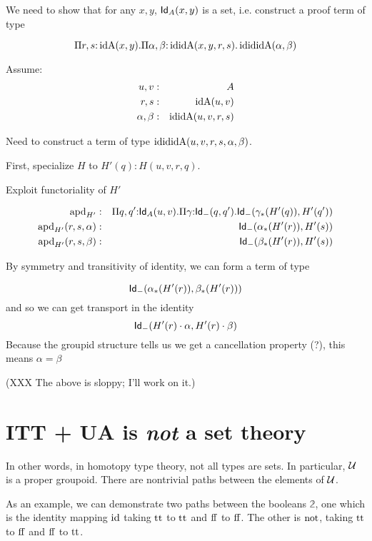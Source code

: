\documentclass[11pt]{article}
\begin{document}
We need to show that for any $x,y$, 
$\mathsf{Id}_{A}(x,y)$ is a set, i.e. construct a proof term of type

\[
\Pi{r,s}{:}\operatorname{idA}(x,y).\Pi{\alpha,\beta}{:}\operatorname{ididA}(x,y,r,s).
\operatorname{idididA}(\alpha,\beta)
\]

Assume:
\begin{eqnarray*}
u,v &:& A\\
r,s &:& \operatorname{idA}(u,v)\\
\alpha,\beta &:& \operatorname{ididA}(u,v,r,s)
\end{eqnarray*}

Need to construct a term of type $\operatorname{idididA}(u,v,r,s,\alpha,\beta)$.

First, specialize $H$ to $H'(q) : H(u,v,r,q)$.

Exploit functoriality of $H'$

\begin{eqnarray*}
\operatorname{apd}_{H'} &:& \Pi{q,q'}{:}\mathsf{Id}_{A}(u,v).
                \Pi{\gamma}{:}\mathsf{Id}_{-}(q,q').
                  \mathsf{Id}_{-}(\gamma_{*}(H'(q)), H'(q'))\\
\operatorname{apd}_{H'}(r,s,\alpha) &:& \mathsf{Id}_{-}(\alpha_{*}(H'(r)), H'(s))\\
\operatorname{apd}_{H'}(r,s,\beta) &:& \mathsf{Id}_{-}(\beta_*{}(H'(r)), H'(s))
\end{eqnarray*}

By symmetry and transitivity of identity, we can form a term of type

\[
\mathsf{Id}_{-}(\alpha_*(H'(r)), \beta_*(H'(r)))
\]
and so we can get transport in the identity
\[
\mathsf{Id}_{-}(H'(r)\cdot \alpha, H'(r)\cdot\beta)
\]
Because the groupid structure tells us we get a cancellation property (?),
this means $\alpha = \beta$

(XXX The above is sloppy; I'll work on it.)

\section{ITT + UA is {\em not} a set theory}

In other words, in homotopy type theory, not all types are sets. In
particular, $\mathcal{U}$ is a proper groupoid. There are nontrivial paths
between the elements of $\mathcal{U}$.

As an example, we can demonstrate two paths between the booleans
$\mathbb{2}$, one which is the identity mapping $\operatorname{id}$ taking $\operatorname{tt}$
to $\operatorname{tt}$ and $\operatorname{ff}$ to $\operatorname{ff}$. The other is $\operatorname{not}$, taking
$\operatorname{tt}$ to $\operatorname{ff}$ and $\operatorname{ff}$ to $\operatorname{tt}$.
\end{document}
